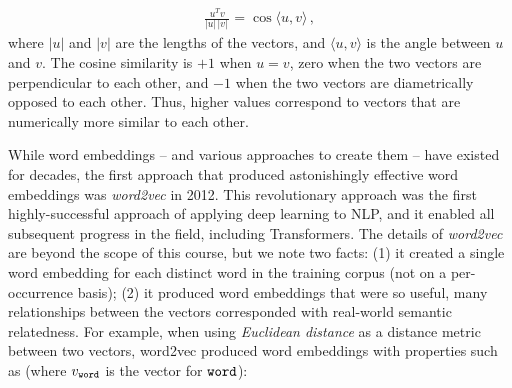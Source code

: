 



\begin{eqnarray}
  \frac{u^T v}{ |u|\, |v|\,} = \cos \langle u, v \rangle
  \,,
\end{eqnarray}
where $|u|$ and $|v|$ are the lengths of the vectors, and $\langle u, v \rangle$ is the angle between $u$ and $v$.  The cosine similarity is $+1$ when $u=v$, zero when the two vectors are perpendicular to each other, and $-1$ when the two vectors are diametrically opposed to each other.  Thus, higher values correspond to vectors that are numerically more similar to each other.

While word embeddings -- and various approaches to create them -- have existed for decades, the first approach that produced astonishingly effective word embeddings was {\em word2vec} in 2012. This revolutionary approach was the first highly-successful approach of applying deep learning to NLP, and it enabled all subsequent progress in the field, including Transformers. The details of {\em word2vec} are beyond the scope of this course, but we note two facts: (1) it created a single word embedding for each distinct word in the training corpus (not on a per-occurrence basis); (2) it produced word embeddings that were so useful, many relationships between the vectors corresponded with real-world semantic relatedness. For example, when using {\em Euclidean distance} as a distance metric between two vectors, word2vec produced word embeddings with properties such as (where $v_{\tt word}$ is the vector for ${\tt word}$):



